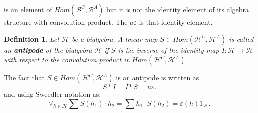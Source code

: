 \documentclass[a4paper, 12pt]{article}
\newtheorem{definition}{Definition}
\begin{document}
is an
element of $Hom(\mathcal{B}^C, \mathcal{B}^A)$ but it is not the identity element of its algebra structure
with convolution product. The $u\varepsilon$ is that identity element.
\begin{definition}
Let $\mathcal{H}$ be a bialgebra. A linear map $S \in Hom(\mathcal{H}^C, \mathcal{H}^A)$ is called an
\textbf{antipode} of the bialgebra $\mathcal{H}$ if $S$ is the inverse of the identity map
$I : \mathcal{H} \to \mathcal{H}$ with respect to the convolution product in
$Hom(\mathcal{H}^C, \mathcal{H}^A)$
\end{definition}
The fact that $S \in Hom(\mathcal{H}^C, \mathcal{H}^A)$ is an antipode is written as
\begin{equation*}
S * I = I * S = u\varepsilon.
\end{equation*}
and using Sweedler notation as:
\begin{equation*}
\forall_{h \in \mathcal{H}} \sum S(h_1) \cdot h_2 = \sum h_1 \cdot S(h_2) = \varepsilon(h)1_\mathcal{H}.
\end{equation*}
\end{document}
